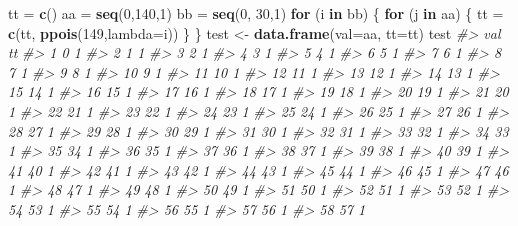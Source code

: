 \documentclass[]{article}
\newenvironment{Shaded}{\begin{snugshade}}{\end{snugshade}}
\newcommand{\CommentTok}[1]{\textcolor[rgb]{0.56,0.35,0.01}{\textit{#1}}}
\newcommand{\ControlFlowTok}[1]{\textcolor[rgb]{0.13,0.29,0.53}{\textbf{#1}}}
\newcommand{\DataTypeTok}[1]{\textcolor[rgb]{0.13,0.29,0.53}{#1}}
\newcommand{\DecValTok}[1]{\textcolor[rgb]{0.00,0.00,0.81}{#1}}
\newcommand{\KeywordTok}[1]{\textcolor[rgb]{0.13,0.29,0.53}{\textbf{#1}}}
\newcommand{\NormalTok}[1]{#1}
\newcommand{\StringTok}[1]{\textcolor[rgb]{0.31,0.60,0.02}{#1}}
\begin{document}
\begin{Shaded}
\begin{Highlighting}[]
\NormalTok{tt =}\StringTok{ }\KeywordTok{c}\NormalTok{()}
\NormalTok{aa =}\StringTok{ }\KeywordTok{seq}\NormalTok{(}\DecValTok{0}\NormalTok{,}\DecValTok{140}\NormalTok{,}\DecValTok{1}\NormalTok{)}
\NormalTok{bb =}\StringTok{ }\KeywordTok{seq}\NormalTok{(}\DecValTok{0}\NormalTok{, }\DecValTok{30}\NormalTok{,}\DecValTok{1}\NormalTok{)}
\ControlFlowTok{for}\NormalTok{ (i }\ControlFlowTok{in}\NormalTok{ bb) \{}
    \ControlFlowTok{for}\NormalTok{ (j }\ControlFlowTok{in}\NormalTok{ aa) \{}
\NormalTok{        tt =}\StringTok{ }\KeywordTok{c}\NormalTok{(tt, }\KeywordTok{ppois}\NormalTok{(}\DecValTok{149}\NormalTok{,}\DataTypeTok{lambda=}\NormalTok{i))}
\NormalTok{    \}}
\NormalTok{\}}
\NormalTok{test <-}\StringTok{ }\KeywordTok{data.frame}\NormalTok{(}\DataTypeTok{val=}\NormalTok{aa, }\DataTypeTok{tt=}\NormalTok{tt)}
\NormalTok{test}
\CommentTok{#>      val tt}
\CommentTok{#> 1      0  1}
\CommentTok{#> 2      1  1}
\CommentTok{#> 3      2  1}
\CommentTok{#> 4      3  1}
\CommentTok{#> 5      4  1}
\CommentTok{#> 6      5  1}
\CommentTok{#> 7      6  1}
\CommentTok{#> 8      7  1}
\CommentTok{#> 9      8  1}
\CommentTok{#> 10     9  1}
\CommentTok{#> 11    10  1}
\CommentTok{#> 12    11  1}
\CommentTok{#> 13    12  1}
\CommentTok{#> 14    13  1}
\CommentTok{#> 15    14  1}
\CommentTok{#> 16    15  1}
\CommentTok{#> 17    16  1}
\CommentTok{#> 18    17  1}
\CommentTok{#> 19    18  1}
\CommentTok{#> 20    19  1}
\CommentTok{#> 21    20  1}
\CommentTok{#> 22    21  1}
\CommentTok{#> 23    22  1}
\CommentTok{#> 24    23  1}
\CommentTok{#> 25    24  1}
\CommentTok{#> 26    25  1}
\CommentTok{#> 27    26  1}
\CommentTok{#> 28    27  1}
\CommentTok{#> 29    28  1}
\CommentTok{#> 30    29  1}
\CommentTok{#> 31    30  1}
\CommentTok{#> 32    31  1}
\CommentTok{#> 33    32  1}
\CommentTok{#> 34    33  1}
\CommentTok{#> 35    34  1}
\CommentTok{#> 36    35  1}
\CommentTok{#> 37    36  1}
\CommentTok{#> 38    37  1}
\CommentTok{#> 39    38  1}
\CommentTok{#> 40    39  1}
\CommentTok{#> 41    40  1}
\CommentTok{#> 42    41  1}
\CommentTok{#> 43    42  1}
\CommentTok{#> 44    43  1}
\CommentTok{#> 45    44  1}
\CommentTok{#> 46    45  1}
\CommentTok{#> 47    46  1}
\CommentTok{#> 48    47  1}
\CommentTok{#> 49    48  1}
\CommentTok{#> 50    49  1}
\CommentTok{#> 51    50  1}
\CommentTok{#> 52    51  1}
\CommentTok{#> 53    52  1}
\CommentTok{#> 54    53  1}
\CommentTok{#> 55    54  1}
\CommentTok{#> 56    55  1}
\CommentTok{#> 57    56  1}
\CommentTok{#> 58    57  1}

\end{Highlighting}
\end{Shaded}
\end{document}
